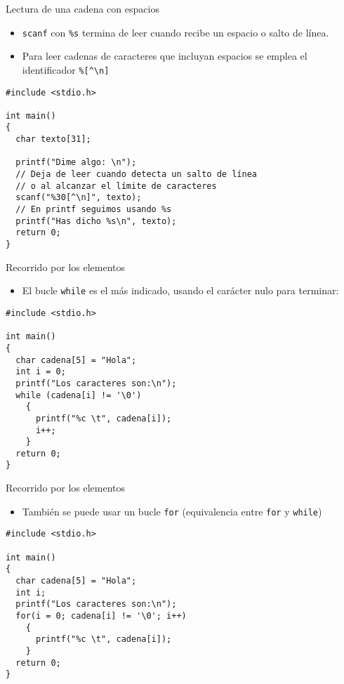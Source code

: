 \documentclass[xcolor={usenames,svgnames,dvipsnames}, aspectratio=169]{beamer}
\begin{document}
\begin{frame}[label={sec:org616c3c4},fragile]{Lectura de una cadena con espacios}
 \begin{itemize}
\item \texttt{scanf} con \texttt{\%s} termina de leer cuando recibe un espacio o salto de línea.
\item Para leer cadenas de caracteres que incluyan espacios se emplea el identificador \texttt{\%[\textasciicircum{}\textbackslash{}n]}
\end{itemize}
\lstset{language=C,label= ,caption= ,captionpos=b,numbers=none}
\begin{lstlisting}
#include <stdio.h>

int main()
{
  char texto[31];

  printf("Dime algo: \n");
  // Deja de leer cuando detecta un salto de línea
  // o al alcanzar el límite de caracteres
  scanf("%30[^\n]", texto);
  // En printf seguimos usando %s
  printf("Has dicho %s\n", texto);
  return 0;
}
\end{lstlisting}
\end{frame}
\begin{frame}[label={sec:org2c54c68},fragile]{Recorrido por los elementos}
 \begin{itemize}
\item El bucle \texttt{while} es el más indicado, usando el carácter nulo para terminar:
\end{itemize}

\lstset{language=C,label= ,caption= ,captionpos=b,numbers=none}
\begin{lstlisting}
#include <stdio.h>

int main()
{
  char cadena[5] = "Hola";
  int i = 0;
  printf("Los caracteres son:\n");
  while (cadena[i] != '\0')
    {
      printf("%c \t", cadena[i]);
      i++;
    }
  return 0;
}
\end{lstlisting}
\end{frame}

\begin{frame}[label={sec:orgcc22982},fragile]{Recorrido por los elementos}
 \begin{itemize}
\item También se puede usar un bucle \texttt{for} (equivalencia entre \texttt{for} y \texttt{while})
\end{itemize}

\lstset{language=C,label= ,caption= ,captionpos=b,numbers=none}
\begin{lstlisting}
#include <stdio.h>

int main()
{
  char cadena[5] = "Hola";
  int i;
  printf("Los caracteres son:\n");
  for(i = 0; cadena[i] != '\0'; i++)
    {
      printf("%c \t", cadena[i]);
    }
  return 0;
}
\end{lstlisting}
\end{frame}
\end{document}
